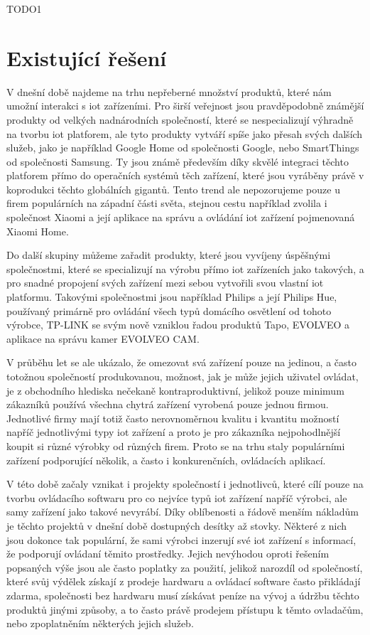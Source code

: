 TODO1

\section{Existující řešení}

V dnešní době najdeme na trhu nepřeberné množství produktů, které nám umožní interakci s \acrshort{iot} zařízeními. Pro širší veřejnost jsou pravděpodobně známější produkty od velkých nadnárodních společností, které se nespecializují výhradně na tvorbu \acrshort{iot} platforem, ale tyto produkty vytváří spíše jako přesah svých dalších služeb, jako je například Google Home od společnosti Google, nebo SmartThings od společnosti Samsung. Ty jsou známě především díky skvělé integraci těchto platforem přímo do operačních systémů těch zařízení, které jsou vyráběny právě v koprodukci těchto globálních gigantů. Tento trend ale nepozorujeme pouze u firem populárních na západní části světa, stejnou cestu například zvolila i společnost Xiaomi a její aplikace na správu a ovládání \acrshort{iot} zařízení pojmenovaná Xiaomi Home.

Do další skupiny můžeme zařadit produkty, které jsou vyvíjeny úspěšnými společnostmi, které se specializují na výrobu přímo \acrshort{iot} zařízeních jako takových, a pro snadné propojení svých zařízení mezi sebou vytvořili svou vlastní \acrshort{iot} platformu. Takovými společnostmi jsou například Philips a její Philips Hue, používaný primárně pro ovládání všech typů domácího osvětlení od tohoto výrobce, TP-LINK se svým nově vzniklou řadou produktů Tapo, EVOLVEO a aplikace na správu kamer EVOLVEO CAM.

V průběhu let se ale ukázalo, že omezovat svá zařízení pouze na jedinou, a často totožnou společností produkovanou, možnost, jak je může jejich uživatel ovládat, je z obchodního hlediska nečekaně kontraproduktivní, jelikož pouze minimum zákazníků používá všechna chytrá zařízení vyrobená pouze jednou firmou. Jednotlivé firmy mají totiž často nerovnoměrnou kvalitu i kvantitu možností napříč jednotlivými typy \acrshort{iot} zařízení a proto je pro zákazníka nejpohodlnější koupit si různé výrobky od různých firem. Proto se na trhu staly populárními zařízení podporující několik, a často i konkurenčních, ovládacích aplikací.

V této době začaly vznikat i projekty společností i jednotlivců, které cílí pouze na tvorbu ovládacího softwaru pro co nejvíce typů \acrshort{iot} zařízení napříč výrobci, ale samy zařízení jako takové nevyrábí. Díky oblíbenosti a řádově menším nákladům je těchto projektů v dnešní době dostupných desítky až stovky. Některé z nich jsou dokonce tak populární, že sami výrobci inzerují své \acrshort{iot} zařízení s informací, že podporují ovládaní těmito prostředky. Jejich nevýhodou oproti řešením popsaných výše jsou ale často poplatky za použití, jelikož narozdíl od společností, které svůj výdělek získají z prodeje hardwaru a ovládací software často přikládají zdarma, společnosti bez hardwaru musí získávat peníze na vývoj a údržbu těchto produktů jinými způsoby, a to často právě prodejem přístupu k těmto ovladačům, nebo zpoplatněním některých jejich služeb.


